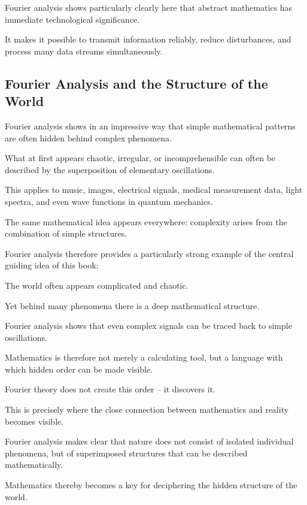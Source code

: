 Fourier analysis shows particularly clearly here
that abstract mathematics has immediate technological significance.

It makes it possible
to transmit information reliably,
reduce disturbances,
and process many data streams simultaneously.

\subsection{Fourier Analysis and the Structure of the World}

Fourier analysis shows in an impressive way
that simple mathematical patterns are often hidden behind complex phenomena.

What at first appears chaotic,
irregular,
or incomprehensible
can often be described by the superposition of elementary oscillations.

This applies to music,
images,
electrical signals,
medical measurement data,
light spectra,
and even wave functions in quantum mechanics.

The same mathematical idea appears everywhere:
complexity arises from the combination of simple structures.

Fourier analysis therefore provides a particularly strong example
of the central guiding idea of this book:

\begin{NoteBox}
	\small
	\label{box:fourier-mathematische-ordnung}
	The world often appears complicated and chaotic.
	
	Yet behind many phenomena there is
	a deep mathematical structure.
	
	Fourier analysis shows
	that even complex signals
	can be traced back to simple oscillations.
\end{NoteBox}

Mathematics is therefore not merely a calculating tool,
but a language
with which hidden order can be made visible.

Fourier theory does not create this order --
it discovers it.

This is precisely where the close connection
between mathematics and reality becomes visible.

Fourier analysis makes clear
that nature does not consist of isolated individual phenomena,
but of superimposed structures
that can be described mathematically.

Mathematics thereby becomes a key
for deciphering the hidden structure of the world.